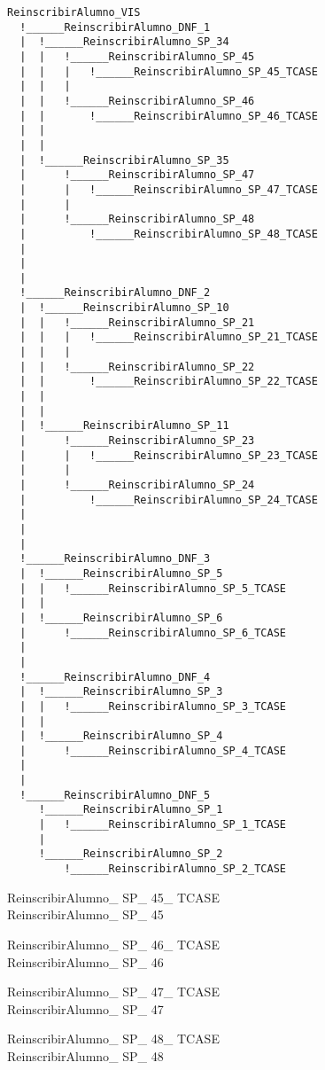 \documentclass{article}
\begin{document}
\begin{verbatim}
ReinscribirAlumno_VIS
  !______ReinscribirAlumno_DNF_1
  |	 !______ReinscribirAlumno_SP_34
  |	 |	 !______ReinscribirAlumno_SP_45
  |	 |	 |	 !______ReinscribirAlumno_SP_45_TCASE
  |	 |	 |
  |	 |	 !______ReinscribirAlumno_SP_46
  |	 |	 	 !______ReinscribirAlumno_SP_46_TCASE
  |	 |	
  |	 |
  |	 !______ReinscribirAlumno_SP_35
  |	 	 !______ReinscribirAlumno_SP_47
  |	 	 |	 !______ReinscribirAlumno_SP_47_TCASE
  |	 	 |
  |	 	 !______ReinscribirAlumno_SP_48
  |	 	 	 !______ReinscribirAlumno_SP_48_TCASE
  |	 	
  |	
  |
  !______ReinscribirAlumno_DNF_2
  |	 !______ReinscribirAlumno_SP_10
  |	 |	 !______ReinscribirAlumno_SP_21
  |	 |	 |	 !______ReinscribirAlumno_SP_21_TCASE
  |	 |	 |
  |	 |	 !______ReinscribirAlumno_SP_22
  |	 |	 	 !______ReinscribirAlumno_SP_22_TCASE
  |	 |	
  |	 |
  |	 !______ReinscribirAlumno_SP_11
  |	 	 !______ReinscribirAlumno_SP_23
  |	 	 |	 !______ReinscribirAlumno_SP_23_TCASE
  |	 	 |
  |	 	 !______ReinscribirAlumno_SP_24
  |	 	 	 !______ReinscribirAlumno_SP_24_TCASE
  |	 	
  |	
  |
  !______ReinscribirAlumno_DNF_3
  |	 !______ReinscribirAlumno_SP_5
  |	 |	 !______ReinscribirAlumno_SP_5_TCASE
  |	 |
  |	 !______ReinscribirAlumno_SP_6
  |	 	 !______ReinscribirAlumno_SP_6_TCASE
  |	
  |
  !______ReinscribirAlumno_DNF_4
  |	 !______ReinscribirAlumno_SP_3
  |	 |	 !______ReinscribirAlumno_SP_3_TCASE
  |	 |
  |	 !______ReinscribirAlumno_SP_4
  |	 	 !______ReinscribirAlumno_SP_4_TCASE
  |	
  |
  !______ReinscribirAlumno_DNF_5
  	 !______ReinscribirAlumno_SP_1
  	 |	 !______ReinscribirAlumno_SP_1_TCASE
  	 |
  	 !______ReinscribirAlumno_SP_2
  	 	 !______ReinscribirAlumno_SP_2_TCASE
\end{verbatim}

\begin{schema}{ReinscribirAlumno\_ SP\_ 45\_ TCASE}\\
 ReinscribirAlumno\_ SP\_ 45
\end{schema}


\begin{schema}{ReinscribirAlumno\_ SP\_ 46\_ TCASE}\\
 ReinscribirAlumno\_ SP\_ 46
\end{schema}


\begin{schema}{ReinscribirAlumno\_ SP\_ 47\_ TCASE}\\
 ReinscribirAlumno\_ SP\_ 47
\end{schema}


\begin{schema}{ReinscribirAlumno\_ SP\_ 48\_ TCASE}\\
 ReinscribirAlumno\_ SP\_ 48
\end{schema}
\end{document}
